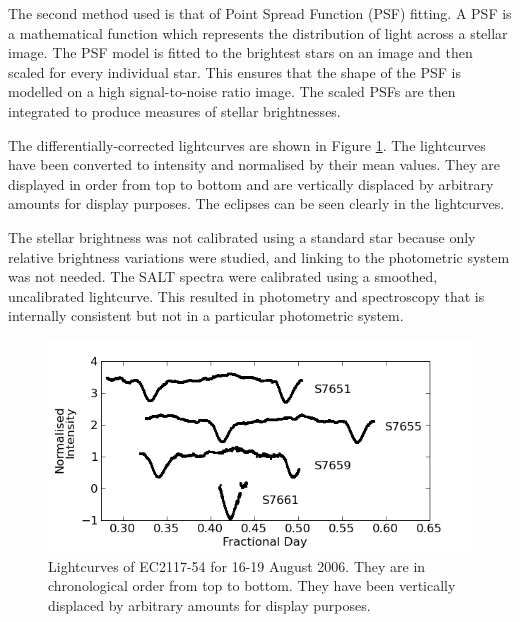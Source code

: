The second method used is that of Point Spread Function (PSF) fitting. A PSF is a mathematical function which represents the distribution of light across a stellar image. The PSF model is fitted to the brightest stars on an image and then scaled for every individual star. This ensures that the shape of the PSF is modelled on a high signal-to-noise ratio image. The scaled PSFs are then integrated to produce measures of stellar brightnesses.

The differentially-corrected lightcurves are shown in Figure \ref{lightcurves}. The lightcurves have been converted to intensity and normalised by their mean values. They are displayed in order from top to bottom and are vertically displaced by arbitrary amounts for display purposes. The eclipses can be seen clearly in the lightcurves.

The stellar brightness was not calibrated using a standard star because only relative brightness variations were studied, and linking to the photometric system was not needed. The SALT spectra were calibrated using a smoothed, uncalibrated lightcurve. This resulted in photometry and spectroscopy that is internally consistent but not in a particular photometric system.



\begin{figure}
\begin{center}
\includegraphics[bb=0 0 600 300,width=\columnwidth]{images/lightcurves.png}
\caption[Lightcurves of EC2117-54 for 16-19 August 2006.]{Lightcurves of EC2117-54 for 16-19 August 2006. They are in chronological order from top to bottom. They have been vertically displaced by arbitrary amounts for display purposes.}
\label{lightcurves}
\end{center}
\end{figure}

